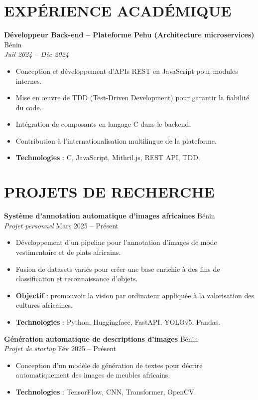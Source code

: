 \documentclass[a4paper,9pt]{extarticle}
\begin{document}
{\section*{EXP\'ERIENCE ACAD\'EMIQUE}
\textbf{D\'eveloppeur Back-end -- Plateforme Pehu (Architecture microservices)} \hfill B\'enin\\
\textit{Juil 2024 -- D\'ec 2024}
\begin{itemize}
    \item Conception et d\'eveloppement d\textquoteright{}APIs REST en JavaScript pour modules internes.
    \item Mise en \oe uvre de TDD (Test-Driven Development) pour garantir la fiabilit\'e du code.
    \item Int\'egration de composants en langage C dans le backend.
    \item Contribution \`a l\textquoteright{}internationalisation multilingue de la plateforme.
    \item \textbf{Technologies} : C, JavaScript, Mithril.js, REST API, TDD.
\end{itemize}

\section*{PROJETS DE RECHERCHE}
\textbf{Syst\`eme d\textquoteright{}annotation automatique d\textquoteright{}images africaines} \hfill B\'enin\\
\textit{Projet personnel} \hfill Mars 2025 -- Pr\'esent
\begin{itemize}
    \item D\'eveloppement d\textquoteright{}un pipeline pour l\textquoteright{}annotation d\textquoteright{}images de mode vestimentaire et de plats africains.
    \item Fusion de datasets vari\'es pour cr\'eer une base enrichie \`a des fins de classification et reconnaissance d\textquoteright{}objets.
    \item \textbf{Objectif} : promouvoir la vision par ordinateur appliqu\'ee \`a la valorisation des cultures africaines.
    \item \textbf{Technologies} : Python, Huggingface, FastAPI, YOLOv5, Pandas.
\end{itemize}

\textbf{G\'en\'eration automatique de descriptions d\textquoteright{}images} \hfill B\'enin\\
\textit{Projet de startup} \hfill F\'ev 2025 -- Pr\'esent
\begin{itemize}
    \item Conception d\textquoteright{}un mod\`ele de g\'en\'eration de textes pour d\'ecrire automatiquement des images de meubles africains.
    \item \textbf{Technologies} : TensorFlow, CNN, Transformer, OpenCV.
\end{itemize}

}
\end{document}
